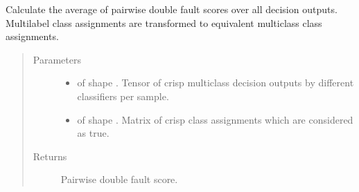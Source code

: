\documentclass[letterpaper,10pt,english]{sphinxmanual}
\begin{document}
\begin{fulllineitems}
\label{\detokenize{pusion.evaluation.evaluation_metrics:pusion.evaluation.evaluation_metrics.pairwise_double_fault}}
\sphinxAtStartPar
Calculate the average of pairwise double fault scores over all decision outputs.
Multilabel class assignments are transformed to equivalent multiclass class assignments.
\begin{quote}\begin{description}
\item[{Parameters}] \leavevmode\begin{itemize}
\item {} 
\sphinxAtStartPar
{} \textendash{}  of shape .
Tensor of crisp multiclass decision outputs by different classifiers per sample.

\item {} 
\sphinxAtStartPar
{} \textendash{}  of shape .
Matrix of crisp class assignments which are considered as true.

\end{itemize}

\item[{Returns}] \leavevmode
\sphinxAtStartPar
Pairwise double fault score.

\end{description}\end{quote}

\end{fulllineitems}

\end{document}
